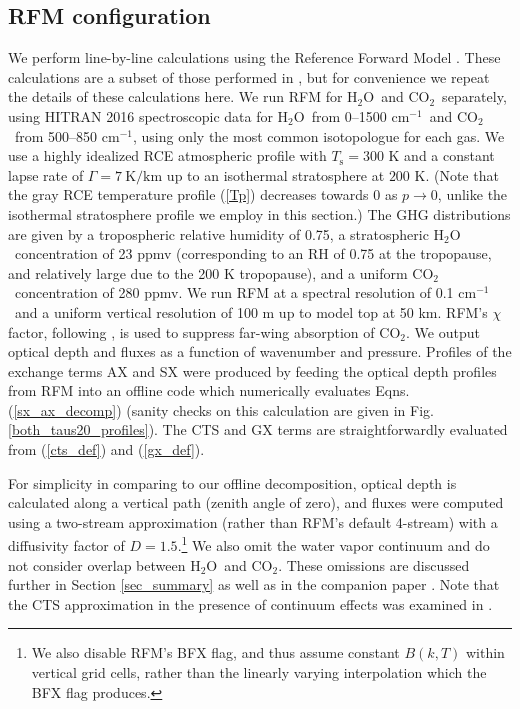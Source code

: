 \documentclass{ametsoc}
\newcommand{\eqnref}[1]{(\ref{#1})}
\newcommand{\Kelvin}{\ensuremath{\mathrm{K}}}
\newcommand{\km}{\ensuremath{\mathrm{km}}}
\newcommand{\cminverse}{\ensuremath{\mathrm{cm^{-1}}}}
\newcommand{\Ts}{\ensuremath{T_\mathrm{s}}}
\newcommand{\cotwo}{\ensuremath{\mathrm{CO_2}}}
\newcommand{\htwo}{\ensuremath{\mathrm{H_2O}}}
\begin{document}
\subsection{RFM configuration}
We perform line-by-line calculations using the Reference Forward Model  \citep[RFM,][]{dudhia2017}. These calculations are a subset of those performed in \cite{jeevanjee2019a}, but for convenience we repeat the details of these calculations here. We run RFM for \htwo\ and \cotwo\ separately, using  HITRAN 2016 spectroscopic data for \htwo\ from 0--1500 \cminverse\ and \cotwo\ from 500--850 \cminverse, using only the most common isotopologue for each gas. We use a highly idealized RCE atmospheric profile with $\Ts= 300$ K and a constant lapse rate of $\Gamma= 7\ \Kelvin/\km$ up to an isothermal stratosphere at $200$ K. (Note that the gray RCE temperature profile \eqnref{Tp} decreases towards 0 as $p\rightarrow 0$, unlike the isothermal stratosphere profile we employ in this section.) The GHG distributions are given by a tropospheric relative humidity of 0.75, a stratospheric \htwo\ concentration of 23 ppmv (corresponding to an RH of 0.75 at the tropopause, and relatively large due to the 200 K tropopause), and a uniform  \cotwo\ concentration of 280 ppmv.   We run RFM at a spectral resolution of 0.1 \cminverse\ and a uniform vertical resolution of 100 m up to model top at 50 km. RFM's $\chi$ factor, following \cite{cousin1985}, is used to suppress far-wing absorption of \cotwo. We output optical depth and fluxes as a function of wavenumber and pressure. Profiles of the exchange terms AX and SX  were produced by feeding the optical depth profiles from RFM into an offline code which numerically evaluates  Eqns. \eqnref{sx_ax_decomp} (sanity checks on this calculation are given in Fig. \ref{both_taus20_profiles}). The CTS and GX terms are straightforwardly evaluated from \eqnref{cts_def} and \eqnref{gx_def}. 

 For simplicity in comparing to our offline decomposition, optical depth is calculated along a vertical path (zenith angle of zero), and fluxes   were computed using a two-stream approximation (rather than RFM's default 4-stream) with a diffusivity factor of $D=1.5$.\footnote{We also disable RFM's BFX flag, and thus assume constant $B(k,T)$ within vertical grid cells, rather than the linearly varying interpolation which the BFX flag produces.} We also omit the water vapor continuum and do not consider overlap between \htwo\ and \cotwo. These omissions are discussed further in Section \ref{sec_summary} as well as in the companion paper  \cite{jeevanjee2019a}. Note that the CTS approximation in the presence of continuum effects was examined in \cite{clough1992}.
 
\end{document}
